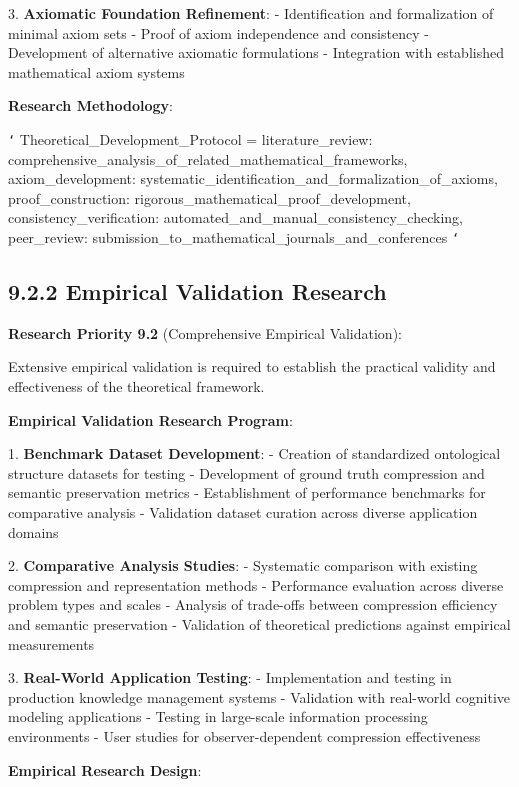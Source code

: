 3. \textbf{Axiomatic Foundation Refinement}:
   - Identification and formalization of minimal axiom sets
   - Proof of axiom independence and consistency
   - Development of alternative axiomatic formulations
   - Integration with established mathematical axiom systems

\textbf{Research Methodology}:

\texttt{`}
Theoretical_Development_Protocol = {
    literature_review: comprehensive_analysis_of_related_mathematical_frameworks,
    axiom_development: systematic_identification_and_formalization_of_axioms,
    proof_construction: rigorous_mathematical_proof_development,
    consistency_verification: automated_and_manual_consistency_checking,
    peer_review: submission_to_mathematical_journals_and_conferences
}
\texttt{`}

\subsection{9.2.2 Empirical Validation Research}

\textbf{Research Priority 9.2} (Comprehensive Empirical Validation):

Extensive empirical validation is required to establish the practical validity and effectiveness of the theoretical framework.

\textbf{Empirical Validation Research Program}:

1. \textbf{Benchmark Dataset Development}:
   - Creation of standardized ontological structure datasets for testing
   - Development of ground truth compression and semantic preservation metrics
   - Establishment of performance benchmarks for comparative analysis
   - Validation dataset curation across diverse application domains

2. \textbf{Comparative Analysis Studies}:
   - Systematic comparison with existing compression and representation methods
   - Performance evaluation across diverse problem types and scales
   - Analysis of trade-offs between compression efficiency and semantic preservation
   - Validation of theoretical predictions against empirical measurements

3. \textbf{Real-World Application Testing}:
   - Implementation and testing in production knowledge management systems
   - Validation with real-world cognitive modeling applications
   - Testing in large-scale information processing environments
   - User studies for observer-dependent compression effectiveness

\textbf{Empirical Research Design}:

